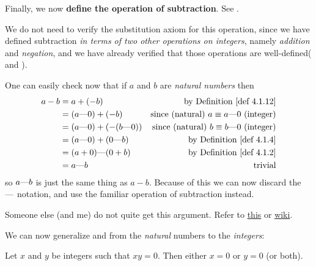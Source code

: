 Finally, we now \textbf{define the operation of subtraction}. See .

We do not need to verify the substitution axiom  for this operation, since we have defined subtraction \emph{in terms of two other operations on integers}, namely \emph{addition} and \emph{negation}, and we have already verified that those
operations are well-defined( and ).

One can easily check now that if \(a\) and \(b\) are \emph{natural numbers} then
\begin{align*}
      a - b & = a + (-b) & \text{by \DEF{4.1.12}} \\
            & = (a \M 0) + (-b) & \text{since (natural) \(a \equiv a \M 0\) (integer)} \\
            & = (a \M 0) + (-(b \M 0)) & \text{since (natural) \(b \equiv b \M 0\) (integer)} \\
            & = (a \M 0) + (0 \M b) & \text{by \DEF{4.1.4}} \\
            & = (a + 0) \M (0 + b) & \text{by \DEF{4.1.2}} \\
            & = a \M b & \text{trivial}
\end{align*}
so \(a \text{---} b\) is just the same thing as \(a - b\).
Because of this we can now discard the \(\text{---}\) notation, and use the familiar operation of subtraction instead.

\begin{note}
Someone else (and me) do not quite get this argument. Refer to \href{https://math.stackexchange.com/questions/3976309/terence-taos-definition-of-subtraction-operation-to-build-integers/3976320}{this} or \href{https://www.wikiwand.com/en/Integer#/Construction}{wiki}.
\end{note}

We can now generalize  and  from the \emph{natural} numbers to the \emph{integers}:

\begin{proposition}  \label{prop 4.1.8}
Let \(x\) and \(y\) be integers such that \(xy = 0\).
Then either \(x = 0\) or \(y = 0\) (or both).
\end{proposition}

